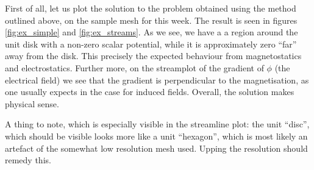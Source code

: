 \documentclass[sigconf]{acmart}
\begin{document}
First of all, let us plot the solution to the problem obtained using the method outlined above, on the sample mesh for this week. The result is seen in figures \ref{fig:ex_simple} and \ref{fig:ex_streams}. As we see, we have a a region around the unit disk with a non-zero scalar potential, while it is approximately zero ``far'' away from the disk. This precisely the expected behaviour from magnetostatics and electrostatics. Further more, on the streamplot of the gradient of $ \phi $ (the electrical field) we see that the gradient is perpendicular to the magnetisation, as one usually expects in the case for induced fields. Overall, the solution makes physical sense.

A thing to note, which is especially visible in the streamline plot: the unit ``disc'', which should be visible looks more like a unit ``hexagon'', which is most likely an artefact of the somewhat low resolution mesh used. Upping the resolution should remedy this.
\end{document}
